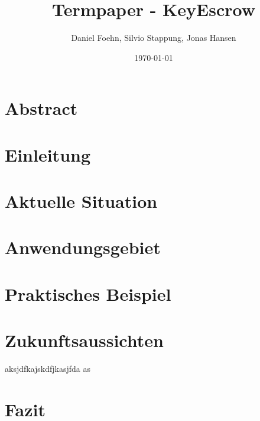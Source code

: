 \documentclass[a4paper, 10pt, fleqn]{article}
\title{Termpaper - KeyEscrow}
\author{Daniel Foehn, Silvio Stappung, Jonas Hansen}
\date{\today} %
\begin{document}
\maketitle
\tableofcontents
\listoffigures
\listoftables
\clearpage
\section{Abstract}

\clearpage
\section{Einleitung}

\clearpage
\section{Aktuelle Situation}
	

\clearpage
\section{Anwendungsgebiet}
	

\clearpage
\section{Praktisches Beispiel}
	 

\clearpage
\section{Zukunftsaussichten}
aksjdfkajskdfjkasjfda  as \cite{wikipedia}
\nocite{*}

\clearpage
\section{Fazit}

\clearpage
\end{document}
